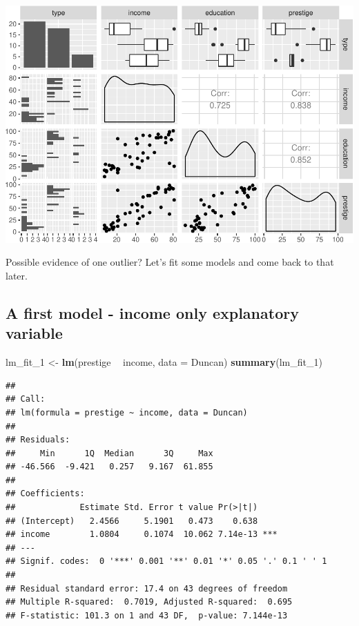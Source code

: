 \documentclass[]{extarticle}
\newenvironment{Shaded}{\begin{snugshade}}{\end{snugshade}}
\newcommand{\KeywordTok}[1]{\textcolor[rgb]{0.13,0.29,0.53}{\textbf{#1}}}
\newcommand{\DataTypeTok}[1]{\textcolor[rgb]{0.13,0.29,0.53}{#1}}
\newcommand{\DecValTok}[1]{\textcolor[rgb]{0.00,0.00,0.81}{#1}}
\newcommand{\StringTok}[1]{\textcolor[rgb]{0.31,0.60,0.02}{#1}}
\newcommand{\OperatorTok}[1]{\textcolor[rgb]{0.81,0.36,0.00}{\textbf{#1}}}
\newcommand{\NormalTok}[1]{#1}
\begin{document}
\includegraphics{20190417_avPlots_files/figure-latex/unnamed-chunk-3-1.pdf}

Possible evidence of one outlier? Let's fit some models and come back to
that later.

\newpage

\subsection{A first model - income only explanatory
variable}\label{a-first-model---income-only-explanatory-variable}

\begin{Shaded}
\begin{Highlighting}[]
\NormalTok{lm_fit_}\DecValTok{1}\NormalTok{ <-}\StringTok{ }\KeywordTok{lm}\NormalTok{(prestige }\OperatorTok{~}\StringTok{ }\NormalTok{income, }\DataTypeTok{data =}\NormalTok{ Duncan)}
\KeywordTok{summary}\NormalTok{(lm_fit_}\DecValTok{1}\NormalTok{)}
\end{Highlighting}
\end{Shaded}

\begin{verbatim}
## 
## Call:
## lm(formula = prestige ~ income, data = Duncan)
## 
## Residuals:
##     Min      1Q  Median      3Q     Max 
## -46.566  -9.421   0.257   9.167  61.855 
## 
## Coefficients:
##             Estimate Std. Error t value Pr(>|t|)    
## (Intercept)   2.4566     5.1901   0.473    0.638    
## income        1.0804     0.1074  10.062 7.14e-13 ***
## ---
## Signif. codes:  0 '***' 0.001 '**' 0.01 '*' 0.05 '.' 0.1 ' ' 1
## 
## Residual standard error: 17.4 on 43 degrees of freedom
## Multiple R-squared:  0.7019, Adjusted R-squared:  0.695 
## F-statistic: 101.3 on 1 and 43 DF,  p-value: 7.144e-13
\end{verbatim}
\end{document}

